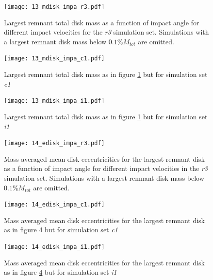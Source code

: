 \begin{landscape}
\begin{figure}
\begin{center}
\texttt{[image: 13\_mdisk\_impa\_r3.pdf]}
\caption{Largest remnant total disk mass as a function of impact angle for different impact velocities for the \emph{r3} simulation set. Simulations with a largest remnant disk mass below $0.1\% M_{tot}$ are omitted.}
\label{ch03_fig13a}
\end{center}
\end{figure}

\begin{figure}
\begin{center}
\texttt{[image: 13\_mdisk\_impa\_c1.pdf]}
\caption{Largest remnant total disk mass as in figure \ref{ch03_fig13a} but for simulation set \emph{c1}}
\label{ch03_fig13b}
\end{center}
\end{figure}

\begin{figure}
\begin{center}
\texttt{[image: 13\_mdisk\_impa\_i1.pdf]}
\caption{Largest remnant total disk mass as in figure \ref{ch03_fig13a} but for simulation set \emph{i1}}
\label{ch03_fig13c}
\end{center}
\end{figure}

\begin{figure}
\begin{center}
\texttt{[image: 14\_edisk\_impa\_r3.pdf]}
\caption{Mass averaged mean disk eccentricities for the largest remnant disk as a function of impact angle for different impact velocities in the \emph{r3} simulation set. Simulations with a largest remnant disk mass below $0.1\% M_{tot}$ are omitted.}
\label{ch03_fig14a}
\end{center}
\end{figure}

\begin{figure}
\begin{center}
\texttt{[image: 14\_edisk\_impa\_c1.pdf]}
\caption{Mass averaged mean disk eccentricities for the largest remnant disk as in figure \ref{ch03_fig14a} but for simulation set \emph{c1}}
\label{ch03_fig14b}
\end{center}
\end{figure}

\begin{figure}
\begin{center}
\texttt{[image: 14\_edisk\_impa\_i1.pdf]}
\caption{Mass averaged mean disk eccentricities for the largest remnant disk as in figure \ref{ch03_fig14a} but for simulation set \emph{i1}}
\label{ch03_fig14c}
\end{center}
\end{figure}
\end{landscape}


